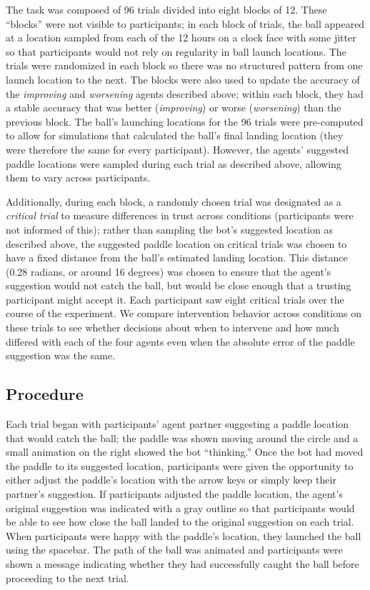 \documentclass[10pt,letterpaper]{article}
\begin{document}
The task was composed of 96 trials divided into eight blocks of 12. These ``blocks'' were not visible to participants; in each block of trials, the ball appeared at a location sampled from each of the 12 hours on a clock face with some jitter so that participants would not rely on regularity in ball launch locations. The trials were randomized in each block so there was no structured pattern from one launch location to the next. The blocks were also used to update the accuracy of the \textit{improving} and \textit{worsening} agents described above; within each block, they had a stable accuracy that was better (\textit{improving}) or worse (\textit{worsening}) than the previous block. The ball's launching locations for the 96 trials were pre-computed to allow for simulations that calculated the ball's final landing location (they were therefore the same for every participant). However, the agents' suggested paddle locations were sampled during each trial as described above, allowing them to vary across participants. 

Additionally, during each block, a randomly chosen trial was designated as a \textit{critical trial} to measure differences in trust across conditions (participants were not informed of this); rather than sampling the bot's suggested location as described above, the suggested paddle location on critical trials was chosen to have a fixed distance from the ball's estimated landing location. This distance (0.28 radians, or around 16 degrees) was chosen to ensure that the agent's suggestion would not catch the ball, but would be close enough that a trusting participant might accept it. Each participant saw eight critical trials over the course of the experiment. We compare intervention behavior across conditions on these trials to see whether decisions about when to intervene and how much differed with each of the four agents even when the absolute error of the paddle suggestion was the same. 


\subsection{Procedure}
Each trial began with participants' agent partner suggesting a paddle location that would catch the ball; the paddle was shown moving around the circle and a small animation on the right showed the bot ``thinking.'' Once the bot had moved the paddle to its suggested location, participants were given the opportunity to either adjust the paddle's location with the arrow keys or simply keep their partner's suggestion. If participants adjusted the paddle location, the agent's original suggestion was indicated with a gray outline so that participants would be able to see how close the ball landed to the original suggestion on each trial. When participants were happy with the paddle's location, they launched the ball using the spacebar. The path of the ball was animated and participants were shown a message indicating whether they had successfully caught the ball before proceeding to the next trial. 
\end{document}
